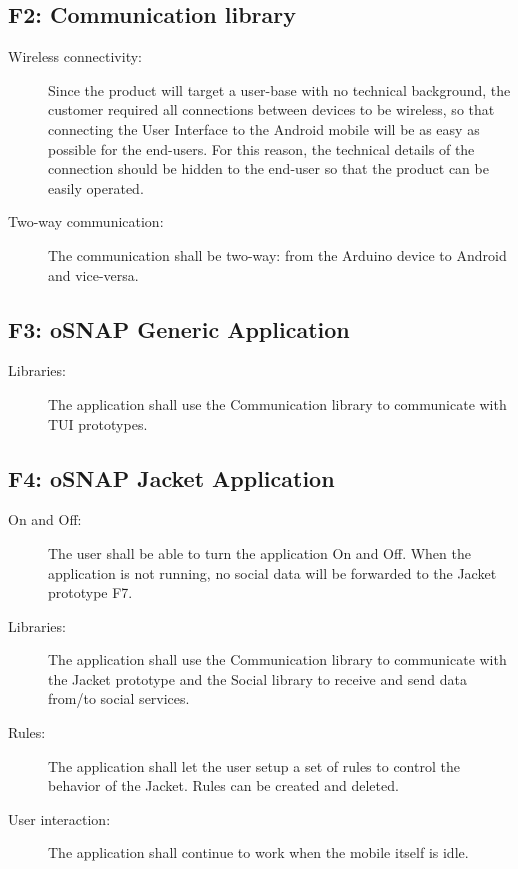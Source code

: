 \subsection{F2: Communication library}
\begin{description}
	\item[Wireless connectivity:] Since the product will target a user-base
	with no technical background, the customer required all connections
	between devices to be wireless, so that connecting the User Interface
	to the Android mobile will be as easy as possible for the end-users.
	For this reason, the technical details of the connection should be
	hidden to the end-user so that the product can be easily operated.
	\item[Two-way communication:] The communication shall be two-way:
	from the Arduino device to Android and vice-versa.
\end{description}

\newpage

\subsection{F3: oSNAP Generic Application}
\begin{description}
	\item[Libraries:] The application shall use the Communication library
	to communicate with TUI prototypes.
\end{description}

\subsection{F4: oSNAP Jacket Application}
\begin{description}
	\item[On and Off:] The user shall be able to turn the application On
	and Off. When the application is not running, no social data will be
	forwarded to the Jacket prototype F7.
	\item[Libraries:] The application shall use the Communication library to
	communicate with the Jacket prototype and the Social library to
	receive and send data from/to social services.
	\item[Rules:] The application shall let the user setup a set of rules
	to control the behavior of the Jacket. Rules can be created and deleted.
	\item[User interaction:] The application shall continue to work
	when the mobile itself is idle.
\end{description}

